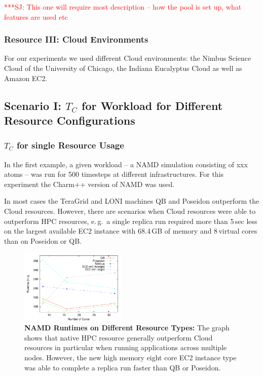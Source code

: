 \documentclass[conference,final]{IEEEtran}
\newcommand{\tc}{$T_{C}$ }
\newcommand{\jhanote}[1]{ {\textcolor{red} { ***SJ: #1 }}}
\newcommand{\jhanote}[1]{}
\begin{document}
\jhanote{This one will require most description -- how the pool is set
up, what features are used etc}

\subsubsection*{Resource III: Cloud Environments}

For our experiments we used different Cloud environments: the Nimbus Science Cloud of the University of Chicago,
the Indiana Eucalyptus Cloud as well as Amazon EC2.


\subsection{Scenario I: \tc for Workload for Different Resource Configurations}

\subsubsection{\tc for single Resource Usage}

In the first example, a given workload -- a NAMD simulation consisting of xxx atoms --
was run for 500 timesteps at different infrastructures. For this experiment the Charm++ 
version of NAMD was used.

In most cases the TeraGrid and LONI machines QB and Poseidon outperform the Cloud resources. 
However, there are scenarios when Cloud resources were
able to outperform HPC resources, e.\,g.\ a single replica run required more than 5\,sec less
on the largest available EC2 instance with 68.4\,GB of memory and 8\,virtual cores than on Poseidon
or QB. 

\begin{figure}[htbp]
    \centering
    \includegraphics[width=0.45\textwidth]{performance/namd_run.pdf}
    \caption{\textbf{NAMD Runtimes on Different Resource Types: } The graph shows that 
             native HPC resource generally outperform Cloud resources in particular when
             running applications across multiple nodes. However, the new high memory eight 
             core EC2 instance type was able to complete a replica run faster than QB or Poseidon.}
    \label{fig:performance_namd_run}
\end{figure}
\end{document}
